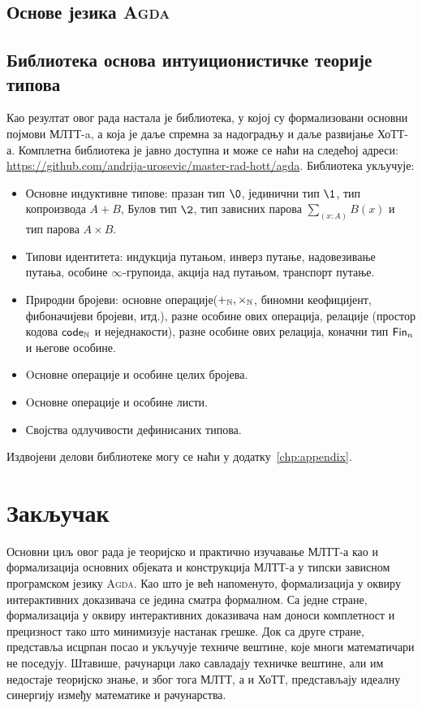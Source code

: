 \documentclass[12pt,oneside]{memoir}
\begin{document}
\section{Основе језика \textsc{Agda}}


\section{Библиотека основа интуиционистичке теорије типова}

Као резултат овог рада настала је библиотека, у којој су формализовани основни појмови МЛТТ-a, а која је даље спремна за надоградњу и даље развијање ХоТТ-а. Комплетна библиотека је јавно доступна и може се наћи на следећој адреси: \url{https://github.com/andrija-urosevic/master-rad-hott/agda}. Библиотека укључује:
\begin{itemize}
    \item{Основне индуктивне типове: празан тип $\0$, јединични тип $\1$, тип копроизвода $A + B$, Булов тип $\2$, тип зависних парова $\sum_{(x : A)} B(x)$ и тип парова $A \times B$.}
    \item{Типови идентитета: индукција путањом, инверз путање, надовезивање путања, особине $\infty$-групоида, акција над путањом, транспорт путање.}
    \item{Природни бројеви: основне операције($+_{\mathbb{N}}, \times_{\mathbb{N}}$, биномни кеофицијент, фибоначијеви бројеви, итд.), разне особине ових операција, релације (простор кодова $\mathsf{code}_{{\mathbb{N}}}$ и неједнакости), разне особине ових релација, коначни тип $\mathsf{Fin}_{n}$ и његове особине.}
    \item{Oсновне операције и особине целих бројева.}
    \item{Oсновне операције и особине листи.}
    \item{Својства одлучивости дефинисаних типова.}
\end{itemize}
Издвојени делови библиотеке могу се наћи у додатку~\ref{chp:appendix}.


\chapter{Закључак}

Основни циљ овог рада је теоријско и практично изучавање МЛТТ-а као и формализација основних објеката и конструкција МЛТТ-а у типски зависном програмском језику \textsc{Agda}. Као што је већ напоменуто, формализација у оквиру интерактивних доказивача се једина сматра формалном. Са једне стране, формализација у оквиру интерактивних доказивача нам доноси комплетност и прецизност тако што минимизује настанак грешке. Док са друге стране, представља исцрпан посао и укључује техниче вештине, које многи математичари не поседују. Штавише, рачунарци лако савладају техничке вештине, али им недостаје теоријско знање, и због тога МЛТТ, а и ХоТТ, представљају идеалну синергију између математике и рачунарства.
\end{document}
